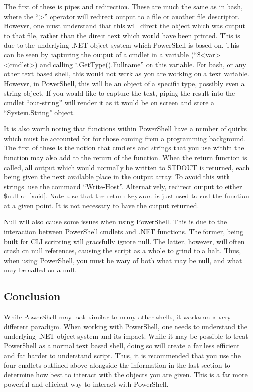			The first of these is pipes and redirection.
			These are much the same as in bash, where the ``>'' operator will redirect output to a file or another file descriptor.
			However, one must understand that this will direct the object which was output to that file, rather than the direct text which would have been printed.
			This is due to the underlying .NET object system which PowerShell is based on.
			This can be seen by capturing the output of a cmdlet in a variable (``\$<var> = <cmdlet>) and calling ``.GetType().Fullname'' on this variable.
			For bash, or any other text based shell, this would not work as you are working on a text variable.
			However, in PowerShell, this will be an object of a specific type, possibly even a string object.
			If you would like to capture the text, piping the result into the cmdlet ``out-string'' will render it as it would be on screen and store a ``System.String'' object.

			It is also worth noting that functions within PowerShell have a number of quirks which must be accounted for for those coming from a programming background.
			The first of these is the notion that cmdlets and strings that you use within the function may also add to the return of the function.
			When the return function is called, all output which would normally be written to STDOUT is returned, each being given the next available place in the output array.
			To avoid this with strings, use the command ``Write-Host''.
			Alternatively, redirect output to either \$null or [void].
			Note also that the return keyword is just used to end the function at a given point.
			It is not necessary to have the output returned.

			Null will also cause some issues when using PowerShell.
			This is due to the interaction between PowerShell cmdlets and .NET functions.
			The former, being built for CLI scripting will gracefully ignore null.
			The latter, however, will often crash on null references, causing the script as a whole to grind to a halt.
			Thus, when using PowerShell, you must be wary of both what may be null, and what may be called on a null.

		\subsection{Conclusion}
			While PowerShell may look similar to many other shells, it works on a very different paradigm.
			When working with PowerShell, one needs to understand the underlying .NET object system and its impact.
			While it may be possible to treat PowerShell as a normal text based shell, doing so will create a far less efficient and far harder to understand script.
			Thus, it is recommended that you use the four cmdlets outlined above alongside the information in the last section to determine how best to interact with the objects you are given.
			This is a far more powerful and efficient way to interact with PowerShell.
